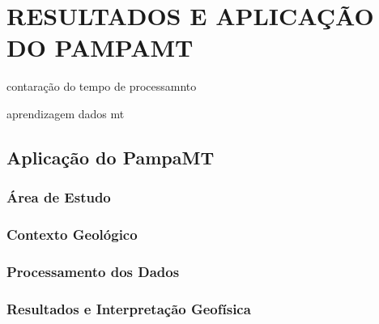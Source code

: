\chapter{RESULTADOS E APLICAÇÃO DO PAMPAMT}
    
    contaração do tempo de processamnto
    
    aprendizagem dados mt
    
    \section{Aplicação do PampaMT}
    
        \subsection{Área de Estudo}
        
        \subsection{Contexto Geológico}
        
        \subsection{Processamento dos Dados}
        
        \subsection{Resultados e Interpretação Geofísica}
        
        
